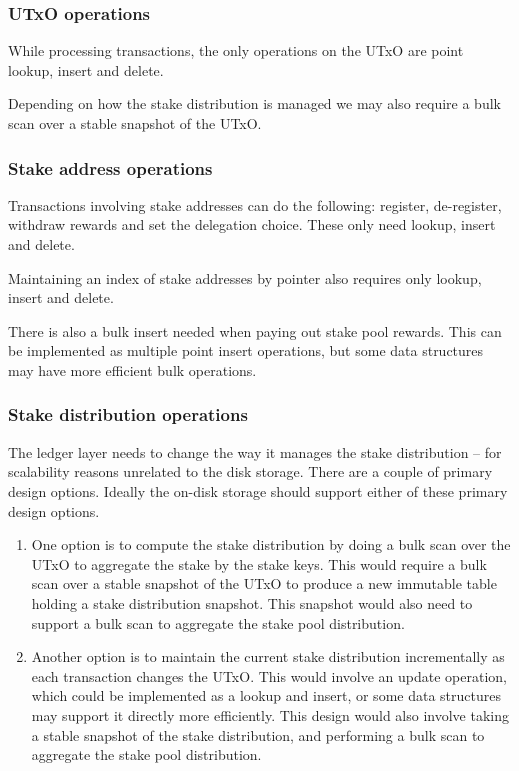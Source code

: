 \documentclass[11pt,a4paper]{article}
\begin{document}
\subsubsection{UTxO operations}

While processing transactions, the only operations on the UTxO are point
{\sc lookup}, {\sc insert} and {\sc delete}.

Depending on how the stake distribution is managed we may also require a
bulk {\sc scan} over a stable snapshot of the UTxO.

\subsubsection{Stake address operations}

Transactions involving stake addresses can do the following: register,
de-register, withdraw rewards and set the delegation choice. These only need
{\sc lookup}, {\sc insert} and {\sc delete}.

Maintaining an index of stake addresses by pointer also requires only
{\sc lookup}, {\sc insert} and {\sc delete}.

There is also a bulk {\sc insert} needed when paying out stake pool rewards.
This can be implemented as multiple point {\sc insert} operations, but some
data structures may have more efficient bulk operations.

\subsubsection{Stake distribution operations}

The ledger layer needs to change the way it manages the stake distribution --
for scalability reasons unrelated to the disk storage. There are a couple of
primary design options. Ideally the on-disk storage should support either of
these primary design options.

\begin{enumerate}
\item One option is to compute the stake distribution by doing a bulk {\sc scan}
      over the UTxO to aggregate the stake by the stake keys. This would
      require a bulk {\sc scan} over a stable snapshot of the UTxO to produce a
      new immutable table holding a stake distribution snapshot. This snapshot
      would also need to support a bulk {\sc scan} to aggregate the stake pool
      distribution.

\item Another option is to maintain the current stake distribution incrementally
      as each transaction changes the UTxO. This would involve an {\sc update}
      operation, which could be implemented as a {\sc lookup} and {\sc insert},
      or some data structures may support it directly more efficiently. This
      design would also involve taking a stable snapshot of the stake
      distribution, and performing a bulk {\sc scan} to aggregate the stake pool
      distribution.
\end{enumerate}
\end{document}
